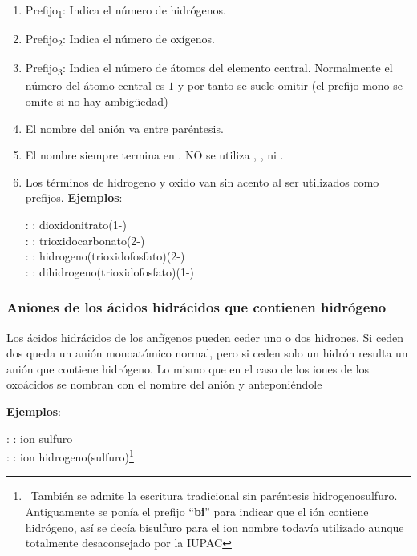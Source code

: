\documentclass[11pt, a4paper]{article}
\begin{document}
\begin{enumerate}
          \begin{enumerate}[label=\textcolor{red}{$\bullet$}]
              \item Prefijo\textsubscript{1}: Indica el número de hidrógenos.
              \item Prefijo\textsubscript{2}: Indica el número de oxígenos.
              \item Prefijo\textsubscript{3}: Indica el número de átomos del elemento central. Normalmente el número del átomo central es $1$ y por tanto se suele omitir (el prefijo mono se omite si no hay ambigüedad)
              \item El nombre del anión va entre paréntesis.
              \item El nombre siempre termina en . NO se utiliza , ,  ni .
              \item Los términos de hidrogeno y oxido van sin acento al ser utilizados como prefijos.
                    \textbf{\uline{Ejemplos}}:

                     :  : dioxidonitrato(1-)\\
                     : : trioxidocarbonato(2-) \\
                     : : hidrogeno(trioxidofosfato)(2-)\\
                     : : dihidrogeno(trioxidofosfato)(1-)

          \end{enumerate}


\end{enumerate}

\subsubsection{Aniones de los ácidos hidrácidos que contienen hidrógeno}

Los ácidos hidrácidos de los anfígenos pueden ceder uno o dos hidrones. Si ceden dos queda un anión monoatómico normal, pero si ceden solo un hidrón resulta un anión que contiene hidrógeno. Lo mismo que en el caso de los iones de los oxoácidos se nombran con el nombre del anión y anteponiéndole 

\textbf{\uline{Ejemplos}}:

\noindent {} :  : ion sulfuro \\
 :  : ion hidrogeno(sulfuro)\footnote{\ También se admite la escritura tradicional sin paréntesis hidrogenosulfuro. Antiguamente se ponía el prefijo “\textbf{bi}” para indicar que el ión contiene hidrógeno, así se decía bisulfuro para el ion  nombre todavía utilizado aunque totalmente desaconsejado por la IUPAC} \\
\end{document}
